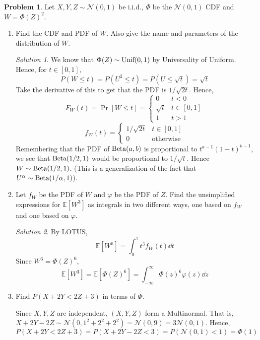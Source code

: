\documentclass[11pt]{article}
\theoremstyle{definition}
\newtheorem{prob}[theo]{\color{Maroon} Problem}
\theoremstyle{remark}
\newtheorem*{soln}{\color{Maroon} Solution}
\newcommand{\E}[1]{\mathbb{E}\left[ #1 \right]}
\newcommand{\Unif}{\textnormal{Unif}}
\newcommand{\Norm}{\mathcal{N}}
\newcommand{\Beta}{\textnormal{Beta}}
\begin{document}
\pagebreak

\begin{prob} Let $X,Y,Z \sim \Norm(0,1)$ be i.i.d., $\Phi$ be the $\Norm(0,1)$ CDF and $W = \Phi(Z)^2$. 

\begin{enumerate}[label = (\alph*)]
    \item Find the CDF and PDF of $W$. Also give the name and parameters of the distribution of $W$.
    
    \begin{soln}
    We know that $\Phi(Z) \sim \Unif(0,1)$ by Universality of Uniform. Hence, for $t \in [0,1]$, $$P(W \leq t) = P(U^2 \leq t) = P(U \leq \sqrt{t}) = \sqrt{t}$$ Take the derivative of this to get that the PDF is $1/\sqrt{2t}$. Hence, $$F_W(t) = \Pr[W \leq t] = \begin{cases} 0 & t < 0 \\ \sqrt{t} & t \in [0,1] \\ 1 & t > 1 \end{cases}$$ $$ f_W(t) = \begin{cases} 1/\sqrt{2t} & t \in [0,1] \\ 0 & \text{otherwise} \end{cases} $$ Remembering that the PDF of $\Beta(a,b)$ is proportional to $t^{a-1} (1-t)^{b-1}$, we see that $\Beta(1/2,1)$ would be proportional to $1/\sqrt{t}$. Hence $W \sim \Beta(1/2,1)$. (This is a generalization of the fact that $U^{\alpha} \sim \Beta(1/\alpha,1)$). 
    \end{soln}
    
    \dotfill
    
    \item Let $f_W$ be the PDF of $W$ and $\varphi$ be the PDF of $Z$. Find the unsimplified expressions for $\E{W^3}$ as integrals in two different ways, one based on $f_W$ and one based on $\varphi$. 
    
    \begin{soln}
    By LOTUS, $$\E{W^3} = \int_0^1 t^3 f_W(t) \dd{t} $$ Since $W^3 = \Phi(Z)^6$, $$\E{W^3} = \E{\Phi(Z)^6} = \int_{-\infty}^{\infty} \Phi(z)^6 \varphi(z) \dd{z} $$ 
    \end{soln} 
    
    \dotfill
    
    \item Find $P(X+2Y < 2Z+3)$ in terms of $\Phi$. 
    
    Since $X,Y,Z$ are independent, $(X,Y,Z)$ form a Multinormal. That is, $X+2Y-2Z \sim \Norm(0, 1^2+2^2+2^2) = \Norm(0,9) = 3 \Norm(0,1)$. Hence, $$P(X+2Y<2Z+3) = P(X+2Y-2Z < 3) = P(\Norm(0,1) < 1) = \Phi(1)$$
    
\end{enumerate}

\end{prob}
\end{document}
